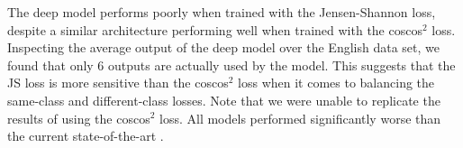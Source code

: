 The deep model performs poorly when trained with the Jensen-Shannon loss, despite a similar architecture performing well when trained with the coscos$^2$ loss.
Inspecting the average output of the deep model over the English data set, we found that only 6 outputs are actually used by the model.
This suggests that the JS loss is more sensitive than the coscos$^2$ loss when it comes to balancing the same-class and different-class losses.
Note that we were unable to replicate the results of \textcite{thiolliere2015hybrid} using the coscos$^2$ loss.
All models performed significantly worse than the current state-of-the-art \parencite{heck2016unsupervised}.


